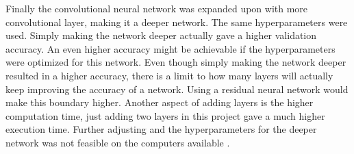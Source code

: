 Finally the convolutional neural network was expanded upon with more convolutional layer, making it a deeper network. The same hyperparameters were used. Simply making the network deeper actually gave a higher validation accuracy. An even higher accuracy might be achievable if the hyperparameters were optimized for this network. Even though simply making the network deeper resulted in a higher accuracy, there is a limit to how many layers will actually keep improving the accuracy of a network. Using a residual neural network would make this boundary higher. Another aspect of adding layers is the higher computation time, just adding two layers in this project gave a much higher execution time. Further adjusting and the hyperparameters for the deeper network was not feasible on the computers available \citep{resnet}. 